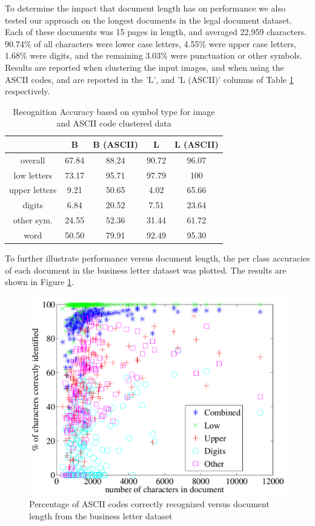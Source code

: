 \documentclass[times, 10pt,twocolumn]{article}
\begin{document}
To determine the impact that document length has on performance we also tested 
our approach on the longest documents in the legal document dataset.  Each of 
these documents was 15 pages in length, and averaged 22,959 characters.
90.74\% of all characters were lower case letters, 4.55\% were upper case 
letters, 1.68\% were digits, and the remaining 3.03\% were punctuation or 
other symbols.  Results are reported when clustering the input images, and 
when using the ASCII codes, and are reported in the 'L', and 'L (ASCII)' 
columns of Table \ref{acc_tbl} respectively.

\begin{table}[ht]
  \begin{tabular}{|c|c|c|c|c|}
    \hline
    & B & B (ASCII) & L & L (ASCII)\\
    \hline
    \hline
    overall & 67.84 & 88.24 & 90.72 & 96.07\\
    \hline
    low letters & 73.17 & 95.71 & 97.79 & 100\\
    \hline
    upper letters & 9.21 & 50.65 & 4.02 & 65.66\\
    \hline
    digits & 6.84 & 20.52 & 7.51 & 23.64\\
    \hline
    other sym. & 24.55 & 52.36 & 31.44 & 61.72\\
    \hline
    word & 50.50 & 79.91 & 92.49 & 95.30\\
    \hline
  \end{tabular}
  \caption{Recognition Accuracy based on symbol type for image and ASCII code
           clustered data}
  \label{acc_tbl}
\end{table}

To further illustrate performance versus document length, the per class
accuracies of each document in the business letter dataset was plotted.  The
results are shown in Figure \ref{acc_v_doclen_fig}.

\begin{figure}[ht]
  \centering
  \includegraphics[scale=.4]{figures/acc_v_doclen}
  \caption{Percentage of ASCII codes correctly recognized versus document
  length from the business letter dataset}
  \label{acc_v_doclen_fig}
\end{figure}
\end{document}
